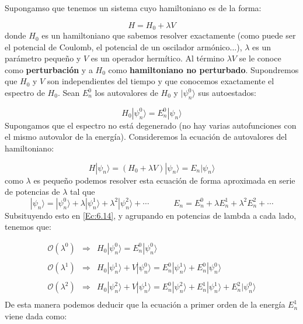 \documentclass[12pt,a4paper]{book}
\numberwithin{equation}{chapter}
\numberwithin{figure}{chapter}
\newcommand{\tquad}{\quad \quad \quad}
\begin{document}
Supongamso que tenemos un sistema cuyo hamiltoniano es de la forma:

\begin{equation}
H = H_0 + \lambda V
\end{equation}
donde $H_0$ es un hamiltoniano que sabemos resolver exactamente (como puede ser el potencial de Coulomb, el potencial de un oscilador armónico...), $\lambda$ es un parámetro pequeño y $V$ es un operador hermítico. Al término $\lambda V$ se le conoce como \textbf{perturbación} y a $H_0$ como \textbf{hamiltoniano no perturbado}. Supondremos que $H_0$ y $V$ son independientes del tiempo y que conocemos exactamente el espectro de $H_0$. Sean $E_n^0$ los autovalores de $H_0$ y $|\psi_n^0\rangle$ sus autoestados:

\begin{equation}
H_0 |\psi_n^0\rangle = E_n^0 |\psi_n \rangle 
\end{equation}
Supongamos que el espectro no está degenerado (no hay varias autofunciones con el mismo autovalor de la energía). Consideremos la ecuación de autovalores del hamiltoniano:

\begin{equation}
H|\psi_n\rangle = (H_0+\lambda V)|\psi_n\rangle = E_n |\psi_n\rangle
\label{Ec:6.14}
\end{equation}
como $\lambda$ es pequeño podemos resolver esta ecuación de forma aproximada en serie de potencias de $\lambda$ tal que
\begin{equation}
|\psi_n\rangle = |\psi_n^0\rangle + \lambda |\psi_n^1\rangle + \lambda^2|\psi_n^2\rangle  + \cdots \tquad E_n=E_n^0 + \lambda E_n^1 + \lambda^2 E_n^2 + \cdots 
\end{equation}
Subsituyendo esto en \ref{Ec:6.14}, y agrupando en potencias de lambda a cada lado, tenemos que:

\begin{equation}
\begin{array}{lll}
\mathcal{O}(\lambda^0) & \Longrightarrow & H_0 |\psi_n^0\rangle = E_n^0 |\psi_n^0 \rangle \\ \\

\mathcal{O}(\lambda^1) & \Longrightarrow & H_0 |\psi_n^1\rangle + V |\psi_n^0\rangle = E_n^0 |\psi_n^1 \rangle +  E_n^0|\psi_n^0 \rangle \\ \\

\mathcal{O}(\lambda^2) & \Longrightarrow & H_0 |\psi_n^2\rangle + V|\psi_n^1\rangle   = E_n^0 |\psi_n^2 \rangle + E_n^1 |\psi_n^1 \rangle +
E_n^2 |\psi_n^0 \rangle \\
\end{array}
\end{equation}
De esta manera podemos deducir que la ecuación a primer orden de la energía $E_n^1$ viene dada como:
\end{document}
